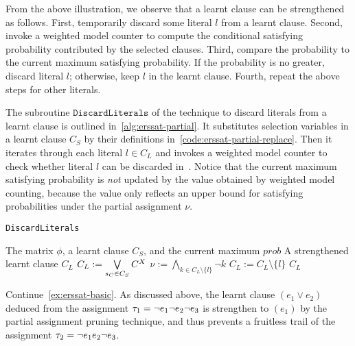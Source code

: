From the above illustration,
we observe that a learnt clause can be strengthened as follows.
First, temporarily discard some literal $l$ from a learnt clause.
Second, invoke a weighted model counter to compute the conditional satisfying probability contributed by the selected clauses.
Third, compare the probability to the current maximum satisfying probability.
If the probability is no greater, discard literal $l$;
otherwise, keep $l$ in the learnt clause.
Fourth, repeat the above steps for other literals.

The subroutine $\texttt{DiscardLiterals}$ of the technique to discard literals from a learnt clause is outlined in~\cref{alg:erssat-partial}.
It substitutes selection variables in a learnt clause $C_S$ by their definitions in~\cref{code:erssat-partial-replace}.
Then it iterates through each literal $l \in C_L$ and invokes a weighted model counter to check whether literal $l$ can be discarded in~.
Notice that the current maximum satisfying probability is \textit{not} updated by the value obtained by weighted model counting,
because the value only reflects an upper bound for satisfying probabilities under the partial assignment $\nu$.

\begin{algorithm}[ht]
    \caption{\texttt{DiscardLiterals}}
    \label{alg:erssat-partial}
    \begin{algorithmic}[1]
        \REQUIRE The matrix $\phi$, a learnt clause $C_S$, and the current maximum $prob$
        \ENSURE A strengthened learnt clause $C_L$
        \STATE $C_L := \bigvee\limits_{s_{C}\in C_S}C^X$\label{code:erssat-partial-replace}
        \label{code:erssat-partial-drop-start}
        \STATE $\nu := \bigwedge\limits_{k\in C_L\setminus\{l\}}\lnot k$
        \STATE $C_L := C_L \setminus \{l\}$\label{code:erssat-partial-drop-end}
        \ENDIF
        \ENDFOR
        \RETURN $C_L$
    \end{algorithmic}
\end{algorithm}

\begin{example}
    \label{ex:erssat-partial}
    Continue~\cref{ex:erssat-basic}.
    As discussed above, the learnt clause $(e_1 \lor e_2)$ deduced from the assignment $\tau_1=\lnot e_1 \lnot e_2 \lnot e_3$ is strengthen to $(e_1)$ by the partial assignment pruning technique,
    and thus prevents a fruitless trail of the assignment $\tau_2=\lnot e_1 e_2 \lnot e_3$.
\end{example}

